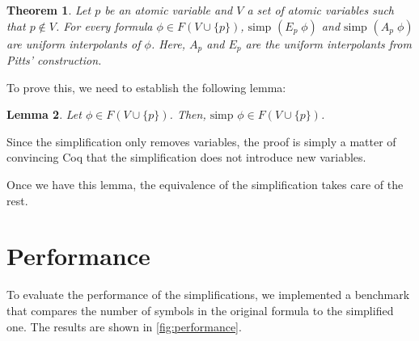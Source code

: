 \documentclass{article}
\newtheorem{theorem}{Theorem}[section]
\newtheorem{lemma}[theorem]{Lemma}
\begin{document}
\begin{theorem}
	Let $p$ be an atomic variable and $V$ a set of atomic variables such that $p \notin V$. For every formula
	$\phi \in F(V \cup \{p\})$, $\text{simp } (E_p \; \phi)$ and $\text{simp } (A_p \; \phi)$ are uniform interpolants
	of $\phi$. Here, $A_p$ and $E_p$ are the uniform interpolants from Pitts' construction.
\end{theorem}

To prove this, we need to establish the following lemma:

\begin{lemma}
	Let $\phi \in F(V \cup \{p\})$. Then, $\text{simp } \phi \in F(V \cup \{p\})$.
\end{lemma}

Since the simplification only removes variables, the proof is simply a matter of convincing Coq that the simplification does not introduce new variables.

Once we have this lemma, the equivalence of the simplification takes care of the rest.


\section{Performance}

To evaluate the performance of the simplifications, we implemented a benchmark that compares the number of symbols in the original
formula to the simplified one. The results are shown in \autoref{fig:performance}.
\end{document}
